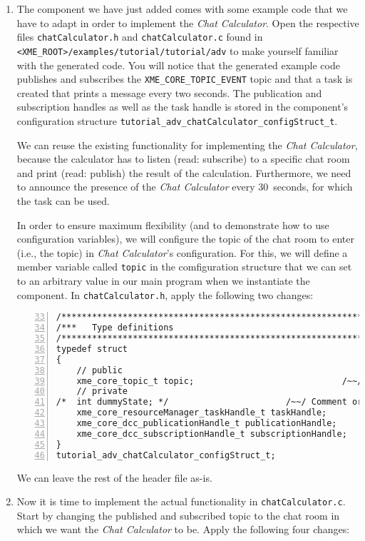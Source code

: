 \begin{enumerate}
	\item The component we have just added comes with some example code that we have to adapt in order to implement the \emph{Chat Calculator}.
		Open the respective files \verb|chatCalculator.h| and \verb|chatCalculator.c| found in \verb|<XME_ROOT>/examples/tutorial/tutorial/adv| to make yourself familiar with the generated code.
		You will notice that the generated example code publishes and subscribes the \verb|XME_CORE_TOPIC_EVENT| topic
		and that a task is created that prints a message every two seconds.
		The publication and subscription handles as well as the task handle is stored in the component's configuration structure \verb|tutorial_adv_chatCalculator_configStruct_t|.
		
		We can reuse the existing functionality for implementing the \emph{Chat Calculator},
		because the calculator has to listen (read: subscribe) to a specific chat room
		and print (read: publish) the result of the calculation.
		Furthermore, we need to announce the presence of the \emph{Chat Calculator} every 30~seconds,
		for which the task can be used.
		
		In order to ensure maximum flexibility (and to demonstrate how to use configuration variables),
		we will configure the topic of the chat room to enter (i.e., the topic) in \emph{Chat Calculator}'s configuration.
		For this, we will define a member variable called \verb|topic| in the comfiguration structure
		that we can set to an arbitrary value in our main program when we instantiate the component.
		In \verb|chatCalculator.h|, apply the following two changes:

\begin{lstlisting}[numbers=left,firstnumber=33]
/*************************************************************************/
/***   Type definitions                                                ***/
/*************************************************************************/
typedef struct
{
	// public
	xme_core_topic_t topic;                             /~~/ Change this line
	// private
/*	int dummyState; */                       /~~/ Comment or remove this line
	xme_core_resourceManager_taskHandle_t taskHandle;
	xme_core_dcc_publicationHandle_t publicationHandle;
	xme_core_dcc_subscriptionHandle_t subscriptionHandle;
}
tutorial_adv_chatCalculator_configStruct_t;
\end{lstlisting}

		We can leave the rest of the header file as-is.

	\item Now it is time to implement the actual functionality in \verb|chatCalculator.c|.
		Start by changing the published and subscribed topic to the chat room in which we want the \emph{Chat Calculator} to be.
		Apply the following four changes:


\end{enumerate}

